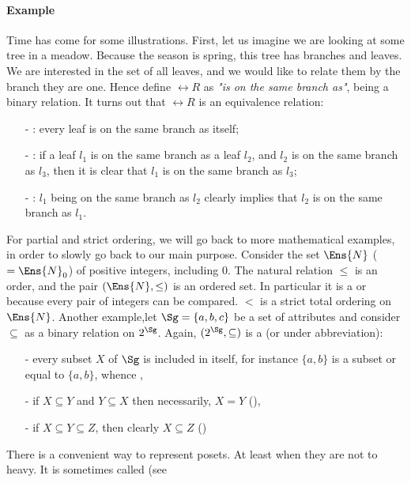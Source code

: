 \paragraph{Example} Time has come for some illustrations. First, let us imagine
we are looking at some tree in a meadow. Because the season is spring, this tree
has branches and leaves. We are interested in the set of all leaves, and we 
would like to relate them by the branch they are one. Hence define $\rel{R}$ as
\textit{"is on the same branch as"}, being a binary relation. It turns out
that $\rel{R}$ is an equivalence relation:
\begin{itemize}
	\item[-] : every leaf is on the same branch as itself;
	\item[-] : if a leaf $l_1$ is on the same branch as
	a leaf $l_2$, and $l_2$ is on the same branch as $l_3$, then it is clear
	that $l_1$ is on the same branch as $l_3$;
	\item[-] : $l_1$ being on the same branch as $l_2$ clearly
	implies that $l_2$ is on the same branch as $l_1$.
\end{itemize}
\noindent For partial and strict ordering, we will go back to more mathematical
examples, in order to slowly go back to our main purpose. Consider the set 
$\Ens{N}$ ($= \Ens{N}_0 $) of positive integers, including 0. The natural 
relation $\leq$ is an order, and the pair $(\Ens{N}, \leq)$ is an ordered set.
In particular it is a  or  because 
every pair of integers can be compared. $<$ is a strict total ordering on 
$\Ens{N}$. Another example,let $\Sg = \{a, b, c \}$ be a set of attributes and
consider $\subseteq$ as a binary relation on $2^{\Sg}$. Again, $(2^{\Sg}, 
\subseteq)$ is a  (or  under 
abbreviation):
\begin{itemize}
	\item[-] every subset $X$ of $\Sg$ is included in itself, for instance 
	$\{a, b\}$ is a subset or equal to $\{a, b\}$, whence ,
	\item[-] if $X \subseteq Y$ and $Y \subseteq X$ then necessarily, $X = Y$
	(),
	\item[-] if $X \subseteq Y \subseteq Z$, then clearly $X \subseteq Z$
	()
\end{itemize}
\noindent There is a convenient way to represent posets. At least when they are
not to heavy. It is sometimes called  (see 
